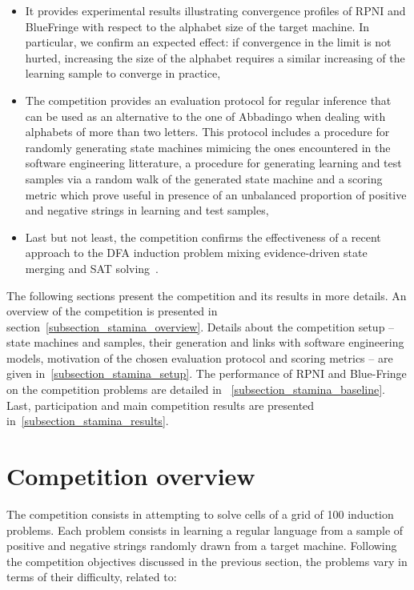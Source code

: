 \begin{itemize}
\item It provides experimental results illustrating convergence profiles of RPNI and BlueFringe with respect to the alphabet size of the target machine. In particular, we confirm an expected effect: if convergence in the limit is not hurted, increasing the size of the alphabet requires a similar increasing of the learning sample to converge in practice,
\item The competition provides an evaluation protocol for regular inference that can be used as an alternative to the one of Abbadingo when dealing with alphabets of more than two letters. This protocol includes a procedure for randomly generating state machines mimicing the ones encountered in the software engineering litterature, a procedure for generating learning and test samples via a random walk of the generated state machine and a scoring metric which prove useful in presence of an unbalanced proportion of positive and negative strings in learning and test samples,
\item Last but not least, the competition confirms the effectiveness of a recent approach to the DFA induction problem mixing evidence-driven state merging and SAT solving~\cite{Heule10}.
\end{itemize}

The following sections present the competition and its results in more details. An overview of the competition is presented in section~\ref{subsection_stamina_overview}. Details about the competition setup -- state machines and samples, their generation and links with software engineering models, motivation of the chosen evaluation protocol and scoring metrics -- are  given in~\ref{subsection_stamina_setup}. The performance of RPNI and Blue-Fringe on the competition problems are detailed in ~\ref{subsection_stamina_baseline}. Last, participation and main competition results are presented in~\ref{subsection_stamina_results}.

\section{Competition overview\label{subsection_stamina_overview}}

The competition consists in attempting to solve cells of a grid of 100 induction problems. Each problem consists in learning a regular language from a sample of positive and negative strings randomly drawn from a target machine. Following the competition objectives discussed in the previous section, the problems vary in terms of their difficulty, related to:

